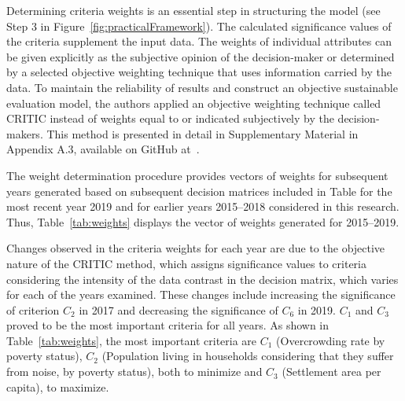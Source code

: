\documentclass[final,5p,times,twocolumn,authoryear]{elsarticle}
\begin{document}
Determining criteria weights is an essential step in structuring the model (see Step 3 in Figure~\ref{fig:practicalFramework}). The calculated significance values of the criteria supplement the input data. The weights of individual attributes can be given explicitly as the subjective opinion of the decision-maker or determined by a selected objective weighting technique that uses information carried by the data. To maintain the reliability of results and construct an objective sustainable evaluation model, the authors applied an objective weighting technique called CRITIC instead of weights equal to or indicated subjectively by the decision-makers. This method is presented in detail in Supplementary Material in Appendix A.3, available on GitHub at~\citep{dariagithub2022}.

The weight determination procedure provides vectors of weights for subsequent years generated based on subsequent decision matrices included in Table for the most recent year 2019 and for earlier years 2015--2018 considered in this research.
Thus, Table~\ref{tab:weights} displays the vector of weights generated for 2015--2019.
%
\begin{table}[H]
\caption{Criteria weights calculated with CRITIC method for evaluated periods (years)}
\label{tab:weights}
\end{table}
%
Changes observed in the criteria weights for each year are due to the objective nature of the CRITIC method, which assigns significance values to criteria considering the intensity of the data contrast in the decision matrix, which varies for each of the years examined. These changes include increasing the significance of criterion $C_{2}$ in 2017 and decreasing the significance of $C_{6}$ in 2019. $C_{1}$ and $C_{3}$ proved to be the most important criteria for all years.
As shown in Table~\ref{tab:weights}, the most important criteria are $C_{1}$ (Overcrowding rate by poverty status), $C_{2}$ (Population living in households considering that they suffer from noise, by poverty status), both to minimize and $C_{3}$ (Settlement area per capita), to maximize.
\end{document}
